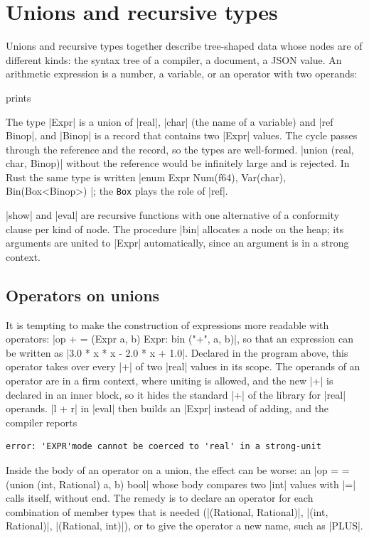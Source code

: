 \section{Unions and recursive types}\label{sec-expr}

Unions and recursive types together describe tree-shaped data whose
nodes are of different kinds: the syntax tree of a compiler, a document,
a JSON value. An arithmetic expression is a number, a variable, or an
operator with two operands:


\noindent prints

The type \code|Expr| is a union of \code|real|, \code|char| (the name of
a variable) and \code|ref Binop|, and \code|Binop| is a record that
contains two \code|Expr| values. The cycle passes through the reference
and the record, so the types are well-formed. \code|union (real, char, Binop)|
without the reference would be infinitely large and is rejected. In Rust
the same type is written
\code|enum Expr { Num(f64), Var(char), Bin(Box<Binop>) }|; the
\texttt{Box} plays the role of \code|ref|.

\code|show| and \code|eval| are recursive functions with one alternative
of a conformity clause per kind of node. The procedure \code|bin|
allocates a node on the heap; its arguments are united to \code|Expr|
automatically, since an argument is in a strong context.

\subsection*{Operators on unions}

It is tempting to make the construction of expressions more readable
with operators: \code|op + = (Expr a, b) Expr: bin ("+", a, b)|, so that
an expression can be written as \code|3.0 * x * x - 2.0 * x + 1.0|.
Declared in the program above, this operator takes over every
\code|+| of two \code|real| values in its scope. The operands of an
operator are in a firm context, where uniting is allowed, and the new
\code|+| is declared in an inner block, so it hides the standard
\code|+| of the library for \code|real| operands. \code|l + r| in
\code|eval| then builds an \code|Expr| instead of adding, and the
compiler reports
\begin{lstlisting}[style=output]
error: 'EXPR'mode cannot be coerced to 'real' in a strong-unit
\end{lstlisting}
Inside the body of an operator on a union, the effect can be worse: an
\code|op = = (union (int, Rational) a, b) bool| whose body compares two
\code|int| values with \code|=| calls itself, without end. The remedy is
to declare an operator for each combination of member types that is
needed (\code|(Rational, Rational)|, \code|(int, Rational)|,
\code|(Rational, int)|), or to give the operator a new name, such as
\code|PLUS|.

